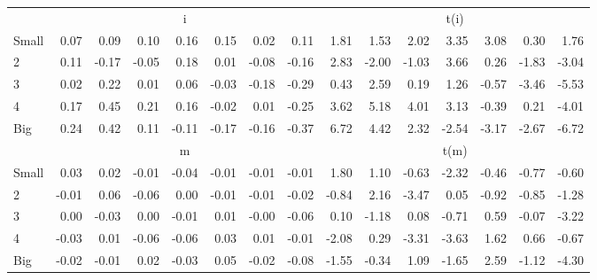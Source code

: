 \begin{table}[!ht]
\begin{tabular}{lrrrrrrrrrrrrrr}
  
     & \multicolumn{7}{c}{i} & \multicolumn{7}{c}{t(i)}   \\
     \cmidrule(r){2-8} \cmidrule(r){9-15} 
    Small  & 0.07  & 0.09  & 0.10  & 0.16  & 0.15  & 0.02  & 0.11  & 1.81  & 1.53  & 2.02  & 3.35  & 3.08  & 0.30  & 1.76   \\
    2  & 0.11  & -0.17  & -0.05  & 0.18  & 0.01  & -0.08  & -0.16  & 2.83  & -2.00  & -1.03  & 3.66  & 0.26  & -1.83  & -3.04   \\
    3  & 0.02  & 0.22  & 0.01  & 0.06  & -0.03  & -0.18  & -0.29  & 0.43  & 2.59  & 0.19  & 1.26  & -0.57  & -3.46  & -5.53   \\
    4  & 0.17  & 0.45  & 0.21  & 0.16  & -0.02  & 0.01  & -0.25  & 3.62  & 5.18  & 4.01  & 3.13  & -0.39  & 0.21  & -4.01   \\
    Big  & 0.24  & 0.42  & 0.11  & -0.11  & -0.17  & -0.16  & -0.37  & 6.72  & 4.42  & 2.32  & -2.54  & -3.17  & -2.67  & -6.72   \\
    
  
     & \multicolumn{7}{c}{m} & \multicolumn{7}{c}{t(m)}   \\
     \cmidrule(r){2-8} \cmidrule(r){9-15} 
    Small  & 0.03  & 0.02  & -0.01  & -0.04  & -0.01  & -0.01  & -0.01  & 1.80  & 1.10  & -0.63  & -2.32  & -0.46  & -0.77  & -0.60   \\
    2  & -0.01  & 0.06  & -0.06  & 0.00  & -0.01  & -0.01  & -0.02  & -0.84  & 2.16  & -3.47  & 0.05  & -0.92  & -0.85  & -1.28   \\
    3  & 0.00  & -0.03  & 0.00  & -0.01  & 0.01  & -0.00  & -0.06  & 0.10  & -1.18  & 0.08  & -0.71  & 0.59  & -0.07  & -3.22   \\
    4  & -0.03  & 0.01  & -0.06  & -0.06  & 0.03  & 0.01  & -0.01  & -2.08  & 0.29  & -3.31  & -3.63  & 1.62  & 0.66  & -0.67   \\
    Big  & -0.02  & -0.01  & 0.02  & -0.03  & 0.05  & -0.02  & -0.08  & -1.55  & -0.34  & 1.09  & -1.65  & 2.59  & -1.12  & -4.30   \\
    
  
  \bottomrule
\end{tabular}
\label{tbl:25_Size_NI_F17}
\end{table}